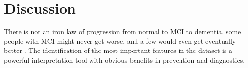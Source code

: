 \documentclass[preprint,12pt]{elsarticle}
\begin{document}


\section{Discussion}
\label{se:dis}

There is not an iron law of progression from normal to MCI to dementia, some people with MCI might never get worse, and a few would even get eventually better \cite{avila2017subjective}. The identification of the most important features in the dataset is a powerful interpretation tool with obvious benefits in prevention and diagnostics. 
\end{document}
